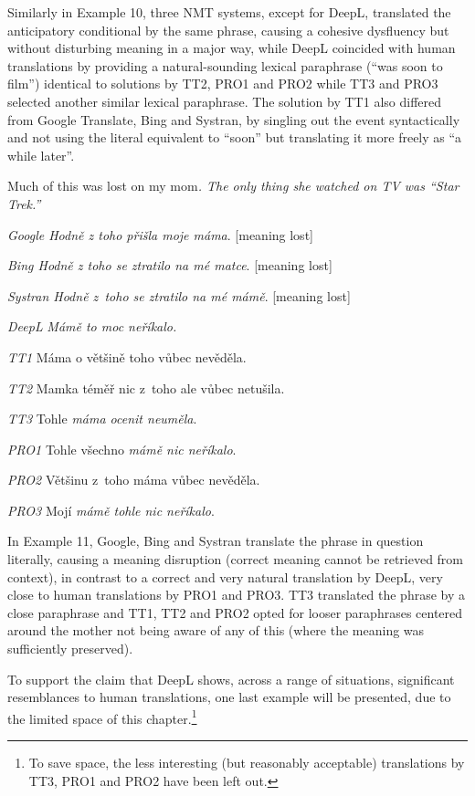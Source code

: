\documentclass[output=paper]{langscibook}
\begin{document}
Similarly in Example 10, three NMT systems, except for DeepL, translated the anticipatory conditional by the same phrase, causing a cohesive dysfluency but without disturbing meaning in a major way, while DeepL coincided with human translations by providing a natural-sounding lexical paraphrase (“was soon to film”) identical to solutions by TT2, PRO1 and PRO2 while TT3 and PRO3 selected another similar lexical paraphrase. The solution by TT1 also differed from Google Translate, Bing and Systran, by singling out the event syntactically and not using the literal equivalent to “soon” but translating it more freely as “a while later”.

\ea \label{ex:kamenicka:7}

Much of this was lost on my mom\textit{. The only thing she watched on TV was “Star Trek.”}

\textit{Google Hodně z toho přišla moje máma}. [meaning lost]

\textit{Bing Hodně z toho se ztratilo na mé matce}. [meaning lost]

\textit{Systran Hodně z~toho se ztratilo na mé mámě}. [meaning lost]

\textit{DeepL} \textit{Mámě to moc neříkalo.}

\textit{TT1} Máma o většině toho vůbec nevěděla.

\textit{TT2} Mamka téměř nic z~toho ale vůbec netušila.

\textit{TT3} Tohle \textit{máma ocenit neuměla}.

\textit{PRO1} Tohle všechno \textit{mámě nic neříkalo}.

\textit{PRO2} Většinu z~toho máma vůbec nevěděla.

\textit{PRO3} Mojí \textit{mámě tohle nic neříkalo}.

\z
In Example 11, Google, Bing and Systran translate the phrase in question literally, causing a meaning disruption (correct meaning cannot be retrieved from context), in contrast to a correct and very natural translation by DeepL, very close to human translations by PRO1 and PRO3. TT3 translated the phrase by a close paraphrase and TT1, TT2 and PRO2 opted for looser paraphrases centered around the mother not being aware of any of this (where the meaning was sufficiently preserved).

To support the claim that DeepL shows, across a range of situations, significant resemblances to human translations, one last example will be presented, due to the limited space of this chapter.\footnote{To save space, the less interesting (but reasonably acceptable) translations by TT3, PRO1 and PRO2 have been left out.}
\end{document}
